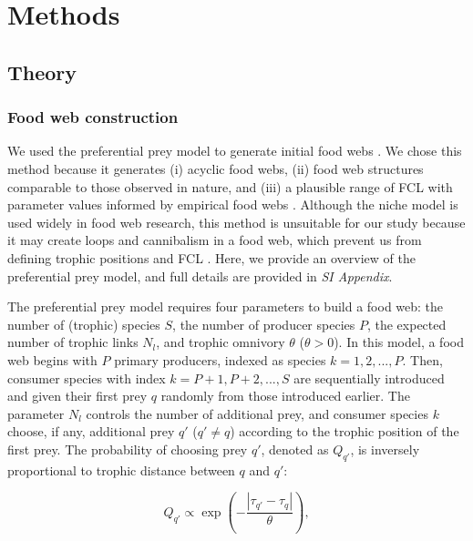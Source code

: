 \documentclass[11pt, class=article, crop=false]{standalone}
\theoremstyle{definition}
\begin{document}

\section{Methods}

\subsection{Theory}

\subsubsection{Food web construction}

We used the preferential prey model to generate initial food webs \citep{johnson_trophic_2014}.
We chose this method because it generates (i) acyclic food webs, (ii) food web structures comparable to those observed in nature, and (iii) a plausible range of FCL with parameter values informed by empirical food webs \citep{shibasaki_food_2024}.
Although the niche model \citep{williams_simple_2000} is used widely in food web research, this method is unsuitable for our study because it may create loops and cannibalism in a food web, which prevent us from defining trophic positions and FCL \citep{shibasaki_food_2024}.
Here, we provide an overview of the preferential prey model, and full details are provided in \textit{SI Appendix}.

The preferential prey model requires four parameters to build a food web: the number of (trophic) species $S$, the number of producer species $P$, the expected number of trophic links $N_l$, and trophic omnivory $\theta$ ($\theta > 0$).
In this model, a food web begins with $P$ primary producers, indexed as species $k = 1, 2, ..., P$.
Then, consumer species with index $k = P + 1, P + 2, ..., S$ are sequentially introduced and given their first prey $q$ randomly from those introduced earlier.
The parameter $N_l$ controls the number of additional prey, and consumer species $k$ choose, if any, additional prey $q'$ ($q' \ne q$) according to the trophic position of the first prey.
The probability of choosing prey $q'$, denoted as $Q_{q'}$, is inversely proportional to trophic distance between $q$ and $q'$:

\begin{equation}
    Q_{q'} 
    \propto 
    \exp
    \left(
    -\frac{|\tau_{q'} - \tau_q|}{\theta}
    \right),
\end{equation}
\end{document}
